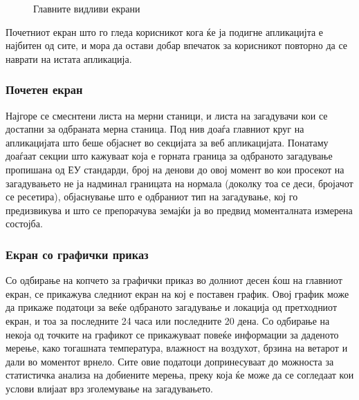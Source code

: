 \documentclass{uvamscse}
\begin{document}
\begin{figure}[H]
\centering
  \caption{Главните видливи екрани}
  \label{fig:mainpage}
\end{figure}

Почетниот екран што го гледа корисникот кога ќе ја подигне апликацијта е најбитен од сите, и мора да остави добар впечаток за корисникот повторно да се наврати на истата апликација. 
\vspace{5mm}

\subsubsection{Почетен екран}

Најгоре се смеснтени листа на мерни станици, и листа на загадувачи кои се достапни за одбраната мерна станица. Под нив доаѓа главниот круг на апликацијата што беше објаснет во секцијата за веб апликацијата. Понатаму доаѓаат секции што кажуваат која е горната граница за одбраното загадување пропишана од ЕУ стандарди, број на денови до овој момент во кои просекот на загадувањето не ја надминал границата на нормала (доколку тоа се деси, бројачот се ресетира), објаснување што е одбраниот тип на загадување, кој го предизвикува и што се препорачува земајќи ја во предвид моменталната измерена состојба.
\vspace{5mm}


\subsubsection{Екран со графички приказ}
Со одбирање на копчето за графички приказ во долниот десен ќош на главниот екран, се прикажува следниот екран на кој е поставен график. Овој график може да прикаже податоци за веќе одбраното загадување и локација од претходниот екран, и тоа за последните 24 часа или последните 20 дена. Со одбирање на некоја од точките на графикот се прикажуваат повеќе информации за даденото мерење, како тогашната температура, влажност на воздухот, брзина на ветарот и дали во моментот врнело. Сите овие податоци допринесуваат до можноста за статистичка анализа на добиените мерења, преку која ќе може да се согледаат кои услови влијаат врз зголемување на загадувањето.
\end{document}
